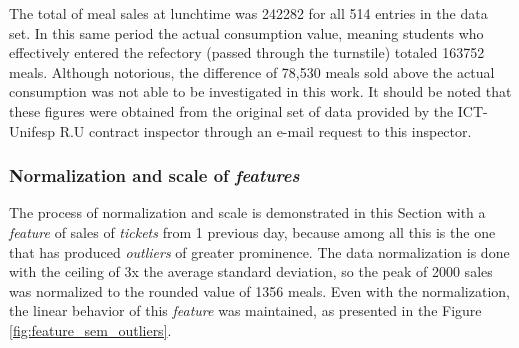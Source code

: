         The total of meal sales at lunchtime was 242282 for all 514 entries in the data set. In this same period the actual consumption value, meaning students who effectively entered the refectory (passed through the turnstile) totaled 163752 meals. Although notorious, the difference of 78,530 meals sold above the actual consumption was not able to be investigated in this work. It should be noted that these figures were obtained from the original set of data provided by the ICT-Unifesp R.U contract inspector through an e-mail request to this inspector.


                    \begin{figure}[!htpb]
                    \end{figure}
                
                
          

            \subsubsection{Normalization and scale of \textit{features}}
            
                The process of normalization and scale is demonstrated in this Section with a \textit{feature} of sales of  \textit{tickets} from 1 previous day, because among all this is the one that has produced \textit{outliers} of greater prominence.
                The data normalization is done with the ceiling of 3x the average standard deviation, so the peak of 2000 sales was normalized to the rounded value of 1356 meals. Even with the normalization, the linear behavior of this \textit{feature} was maintained, as presented in the Figure \ref{fig:feature_sem_outliers}. 

